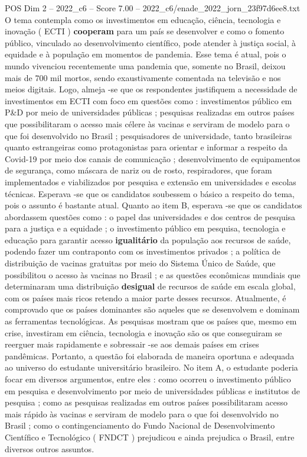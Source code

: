 \begin{textsample}{POS Dim 2 – 2022\_c6 – Score 7.00 – 2022\_c6/enade\_2022\_jorn\_23f97d6ee8.txt}
O tema contempla como os investimentos em educação, ciência, tecnologia e inovação ( ECTI ) \textbf{cooperam} para um país se desenvolver e como o fomento público, vinculado ao desenvolvimento científico, pode atender à justiça social, à equidade e à população em momentos de pandemia.
Esse tema é atual, pois o mundo vivenciou recentemente uma pandemia que, somente no Brasil, deixou mais de 700 mil mortos, sendo exaustivamente comentada na televisão e nos meios digitais.
Logo, almeja -se que os respondentes justifiquem a necessidade de investimentos em ECTI com foco em questões como : investimentos público em P\&D por meio de universidades públicas ; pesquisas realizadas em outros países que possibilitaram o acesso mais célere às vacinas e serviram de modelo para o que foi desenvolvido no Brasil ; pesquisadores de universidade, tanto brasileiras quanto estrangeiras como protagonistas para orientar e informar a respeito da Covid-19 por meio dos canais de comunicação ; desenvolvimento de equipamentos de segurança, como máscara de nariz ou de rosto, respiradores, que foram implementados e viabilizados por pesquisa e extensão em universidades e escolas técnicas.
Esperava -se que os candidatos soubessem o básico a respeito do tema, pois o assunto é bastante atual.
Quanto ao item B, esperava -se que os candidatos abordassem questões como : o papel das universidades e dos centros de pesquisa para a justiça e a equidade ; o investimento público em pesquisa, tecnologia e educação para garantir acesso \textbf{igualitário} da população aos recursos de saúde, podendo fazer um contraponto com os investimentos privados ; a política de distribuição de vacinas gratuitas por meio do Sistema Único de Saúde, que possibilitou o acesso às vacinas no Brasil ; e as questões econômicas mundiais que determinaram uma distribuição \textbf{desigual} de recursos de saúde em escala global, com os países mais ricos retendo a maior parte desses recursos.
Atualmente, é comprovado que os países dominantes são aqueles que se desenvolvem e dominam as ferramentas tecnológicas.
As pesquisas mostram que os países que, mesmo em crise, investiram em ciência, tecnologia e inovação são os que conseguiram se reerguer mais rapidamente e sobressair -se aos demais países em crises pandêmicas.
Portanto, a questão foi elaborada de maneira oportuna e adequada ao universo do estudante universitário brasileiro.
No item A, o estudante poderia focar em diversos argumentos, entre eles : como ocorreu o investimento público em pesquisa e desenvolvimento por meio de universidades públicas e institutos de pesquisa ; como as pesquisas realizadas em outros países possibilitaram acesso mais rápido às vacinas e serviram de modelo para o que foi desenvolvido no Brasil ; como o contingenciamento do Fundo Nacional de Desenvolvimento Científico e Tecnológico ( FNDCT ) prejudicou e ainda prejudica o Brasil, entre diversos outros assuntos.

\end{textsample}
